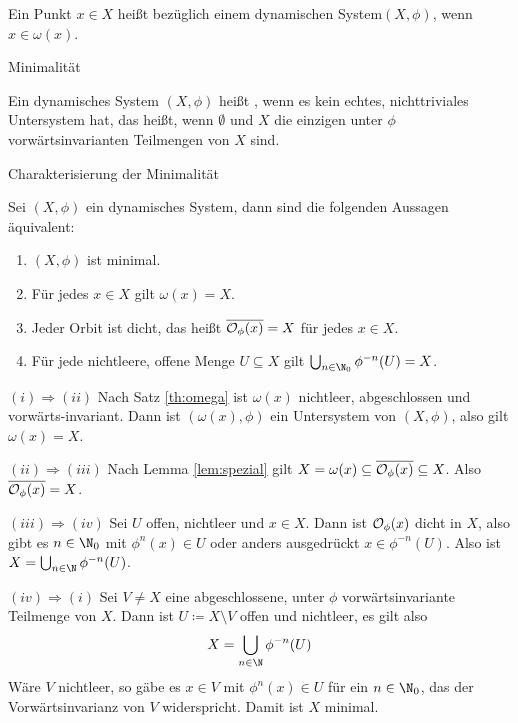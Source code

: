 \begin{definition}
  Ein Punkt $x\in X$ heißt  bezüglich einem dynamischen System$(X,\phi)$, wenn $x \in \omega(x)$.  
\end{definition}
\begin{definition}Minimalität

Ein dynamisches System $(X, \phi)$ heißt , wenn es kein echtes, nichttriviales Untersystem hat, das heißt, wenn $\emptyset$ und $X$ die einzigen unter $\phi$ vorwärtsinvarianten Teilmengen von $X$ sind.
\end{definition}
\begin{lemma}Charakterisierung der Minimalität

Sei $(X, \phi)$ ein dynamisches System, dann sind die folgenden Aussagen äquivalent:
\renewcommand{\labelenumi}{(\roman{enumi})}
\begin{enumerate}
\item $(X, \phi)$ ist minimal.
\item Für jedes $x \in X$ gilt $\omega(x) = X$.
\item Jeder Orbit ist dicht, das heißt $\overline{{\cal O}_\phi(x)} = X$ für jedes $x \in X$.
\item Für jede nichtleere, offene Menge $U \subseteq X$ gilt $\bigcup_{n \in \N_0} \phi^{-n}(U) = X$.
\end{enumerate}
\end{lemma}
\begin{beweis}
{$(i) \Rightarrow (ii)$} 
Nach Satz \ref{th:omega} ist $\omega(x)$ nichtleer, abgeschlossen und vorwärts-invariant. Dann ist $(\omega(x), \phi)$ ein Untersystem von $(X, \phi)$, also gilt $\omega(x) = X$.

{$(ii) \Rightarrow (iii)$} Nach Lemma \ref{lem:spezial} gilt $X = \omega(x) \subseteq \overline{{\cal O}_\phi(x)} \subseteq X$. Also $\overline{{\cal O}_\phi(x)} = X$.

  {$(iii) \Rightarrow (iv)$} Sei $U$ offen, nichtleer und $x \in X$. Dann ist ${\cal O}_\phi (x)$ dicht in $X$, also gibt es $n \in \N_0$ mit $\phi^n(x) \in U$ oder anders ausgedrückt $x \in \phi^{-n}(U)$. Also ist $X = \bigcup_{n \in \N}\phi^{-n}(U)$. 

  {$(iv) \Rightarrow (i)$} Sei $V \neq X$ eine abgeschlossene, unter $\phi$ vorwärtsinvariante Teilmenge von $X$. Dann ist $U \coloneqq X \setminus V $ offen und nichtleer, es gilt also 
  \begin{align*}
    X = \bigcup_{n \in \N} \phi^{-n}(U)
  \end{align*}
Wäre $V$ nichtleer, so gäbe es $x \in V$ mit $\phi^{n}(x)\in U$ für ein $n \in \N_0$, das der Vorwärtsinvarianz von $V$ widerspricht. Damit ist $X$ minimal.
\end{beweis}

